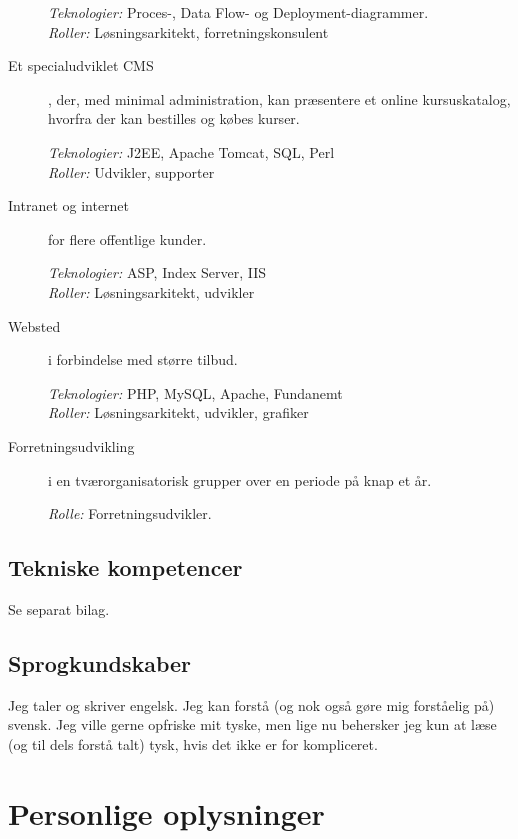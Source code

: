 \documentclass[a4paper,11pt]{article}
\begin{document}
\begin{description}
  \textit{Teknologier:} Proces-, Data Flow- og Deployment-diagrammer.\\
  \textit{Roller:} Løsningsarkitekt, forretningskonsulent

\item[Et specialudviklet CMS], der, med minimal
  administration, kan præsentere et online kursuskatalog,
  hvorfra der kan bestilles og købes kurser.

  \textit{Teknologier:} J2EE, Apache Tomcat, SQL, Perl\\
  \textit{Roller:} Udvikler, supporter

\item[Intranet og internet] for flere offentlige kunder.

  \textit{Teknologier:} ASP, Index Server, IIS\\
  \textit{Roller:} Løsningsarkitekt, udvikler

\item[Websted] i forbindelse med større tilbud.

  \textit{Teknologier:} PHP, MySQL, Apache, Fundanemt\\
  \textit{Roller:} Løsningsarkitekt, udvikler, grafiker

\item[Forretningsudvikling] i en
  tværorganisatorisk grupper over en periode på knap et
  år.

  \textit{Rolle:} Forretningsudvikler.

\end{description}

\subsection*{Tekniske kompetencer}

Se separat bilag.

\subsection*{Sprogkundskaber}

Jeg taler og skriver engelsk. Jeg kan forstå (og nok også gøre mig
forståelig på) svensk. Jeg ville gerne opfriske mit tyske, men lige
nu behersker jeg kun at læse (og til dels forstå talt) tysk, hvis
det ikke er for kompliceret.


\section*{Personlige oplysninger}
\end{document}
